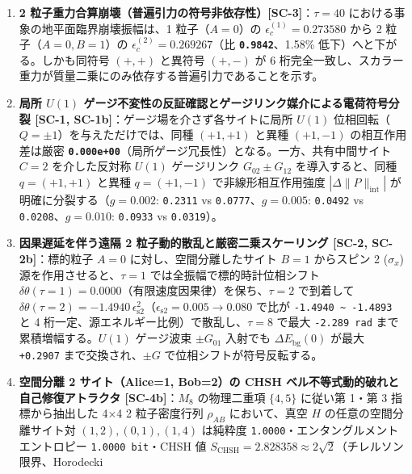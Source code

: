 \documentclass[
  a4paper,
]{ltjsarticle}
\providecommand{\tightlist}{%
  \setlength{\itemsep}{0pt}\setlength{\parskip}{0pt}}
\begin{document}
\begin{enumerate}
\def\labelenumi{\arabic{enumi}.}
\tightlist
\item
  \textbf{2
  粒子重力合算崩壊（普遍引力の符号非依存性）{[}SC-3{]}}：\(\tau = 40\)
  における事象の地平面臨界崩壊振幅は、1 粒子（\(A=0\)）の
  \(\epsilon_c^{(1)} = \mathbf{0.273580}\) から 2 粒子（\(A=0, B=1\)）の
  \(\epsilon_c^{(2)} = \mathbf{0.269267}\)（比
  \textbf{\texttt{0.9842}}、1.58\% 低下）へと下がる。しかも同符号
  \((+,+)\) と異符号 \((+,-)\) が 6
  桁完全一致し、スカラー重力が質量二乗にのみ依存する普遍引力であることを示す。
\item
  \textbf{局所 \(U(1)\)
  ゲージ不変性の反証確認とゲージリンク媒介による電荷符号分裂 {[}SC-1,
  SC-1b{]}}：ゲージ場を介さず各サイトに局所 \(U(1)\)
  位相回転（\(Q = \pm 1\)）を与えただけでは、同種 \((+1,+1)\) と異種
  \((+1,-1)\) の相互作用差は厳密
  \textbf{\texttt{0.000e+00}}（局所ゲージ冗長性）となる。一方、共有中間サイト
  \(C=2\) を介した反対称 \(U(1)\) ゲージリンク \(G_{02} \pm G_{12}\)
  を導入すると、同種 \(q=(+1,+1)\) と異種 \(q=(+1,-1)\)
  で非線形相互作用強度 \(|\Delta\|P\|_{\mathrm{int}}|\)
  が明確に分裂する（\(g=0.002\): \texttt{0.2311} vs
  \texttt{0.0777}、\(g=0.005\): \texttt{0.0492} vs
  \texttt{0.0208}、\(g=0.010\): \texttt{0.0933} vs \texttt{0.0319}）。
\item
  \textbf{因果遅延を伴う遠隔 2 粒子動的散乱と厳密二乗スケーリング
  {[}SC-2, SC-2b{]}}：標的粒子 \(A=0\) に対し、空間分離したサイト
  \(B=1\) からスピン 2 (\(\sigma_x\)) 源を作用させると、\(\tau = 1\)
  では全振幅で標的時計位相シフト
  \textbf{\(\delta\theta(\tau=1) = \mathbf{0.0000}\)}（有限速度因果律）を保ち、\(\tau = 2\)
  で到着して
  \textbf{\(\delta\theta(\tau=2) = -1.4940\,\epsilon_{\mathrm{s2}}^2\)}（\(\epsilon_{\mathrm{s2}} = 0.005 \to 0.080\)
  で比が \texttt{-1.4940\ \textasciitilde{}\ -1.4893} と 4
  桁一定、源エネルギー比例）で散乱し、\(\tau = 8\) で最大
  \texttt{-2.289\ rad} まで累積増幅する。\(U(1)\) ゲージ波束
  \(\pm G_{01}\) 入射でも \(\Delta E_{\mathrm{bg}}(0)\) が最大
  \texttt{+0.2907} まで交換され、\(\pm G\) で位相シフトが符号反転する。
\item
  \textbf{空間分離 2 サイト（Alice=1, Bob=2）の CHSH
  ベル不等式動的破れと自己修復アトラクタ {[}SC-4b{]}}：\(M_8\)
  の物理二重項 \(\{4,5\}\) に従い第 1・第 3 指標から抽出した 4×4 2
  粒子密度行列 \(\rho_{AB}\) において、真空 \(H\)
  の任意の空間分離サイト対 \((1,2), (0,1), (1,4)\) は純粋度
  \texttt{1.0000}・エンタングルメントエントロピー
  \texttt{1.0000\ bit}・CHSH 値
  \textbf{\(S_{\mathrm{CHSH}} = \mathbf{2.828358} \approx 2\sqrt{2}\)}（チレルソン限界、Horodecki

\end{enumerate}
\end{document}
